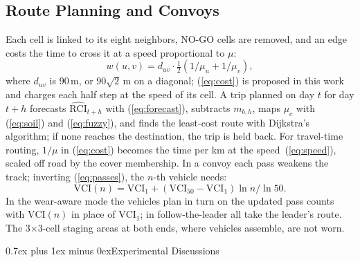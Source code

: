 \documentclass[conference]{IEEEtran}
\makeatletter
\def\section{\needspace{7\baselineskip}\@startsection{section}{1}{\z@}{2.5ex plus 1ex minus 0.5ex}%
{0.7ex plus 1ex minus 0ex}{\normalfont\normalsize\centering\scshape}}
\makeatother
\begin{document}
\subsection{Route Planning and Convoys}
Each cell is linked to its eight neighbors, NO-GO cells are removed, and an edge costs the time
to cross it at a speed proportional to $\mu$:
\begin{equation}
  w(u,v) = d_{uv} \cdot \tfrac{1}{2}\left(1/\mu_u + 1/\mu_v\right),
  \label{eq:cost}
\end{equation}
where $d_{uv}$ is 90\,m, or $90\sqrt{2}$\,m on a diagonal; (\ref{eq:cost}) is proposed in this work and charges each
half step at the speed of its cell. A trip planned on day $t$ for day $t+h$ forecasts
$\widehat{\mathrm{RCI}}_{t+h}$ with (\ref{eq:forecast}), subtracts $m_{b,h}$, maps $\mu_c$ with
(\ref{eq:soil}) and (\ref{eq:fuzzy}), and finds the least-cost route with Dijkstra's
algorithm; if none reaches the destination, the trip is held back. For travel-time
routing, $1/\mu$ in (\ref{eq:cost}) becomes the time per km at the speed~(\ref{eq:speed}), scaled
off road by the cover membership. In a convoy each pass weakens the track; inverting
(\ref{eq:passes}), the $n$-th vehicle needs:
\begin{equation}
  \mathrm{VCI}(n) = \mathrm{VCI}_1 + (\mathrm{VCI}_{50} - \mathrm{VCI}_1)\ln n / \ln 50 .
  \label{eq:wear}
\end{equation}
In the wear-aware mode the vehicles plan in turn on the updated pass counts with
$\mathrm{VCI}(n)$ in place of $\mathrm{VCI}_1$; in follow-the-leader all take the leader's route.
The 3$\times$3-cell staging areas at both ends, where vehicles assemble, are not worn.



\section{Experimental Discussions}
\label{sec:experiments}
\end{document}
